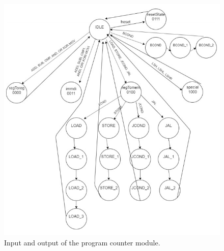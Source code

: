 \documentclass[../ProjectDocumentation.tex]{subfiles}
\begin{document}
\begin{figure}
\centering
\includegraphics[width=12cm]{fsm}
\caption{Input and output of the program counter module.}
\label{fig:fsm}
\end{figure}
\end{document}
